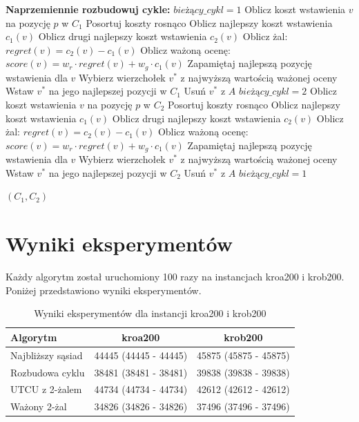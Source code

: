 \documentclass[12pt,a4paper]{article}
\begin{document}
\begin{algorithm}
\begin{algorithmic}[1]
\State \textbf{Naprzemiennie rozbudowuj cykle:}
\State $bieżący\_cykl = 1$ 
                \State Oblicz koszt wstawienia $v$ na pozycję $p$ w $C_1$
            \EndFor
            \State Posortuj koszty rosnąco
            \State Oblicz najlepszy koszt wstawienia $c_1(v)$
            \State Oblicz drugi najlepszy koszt wstawienia $c_2(v)$
            \State Oblicz żal: $regret(v) = c_2(v) - c_1(v)$
            \State Oblicz ważoną ocenę: $score(v) = w_r \cdot regret(v) + w_g \cdot c_1(v)$
            \State Zapamiętaj najlepszą pozycję wstawienia dla $v$
        \EndFor
        \State Wybierz wierzchołek $v^*$ z najwyższą wartością ważonej oceny
        \State Wstaw $v^*$ na jego najlepszej pozycji w $C_1$
        \State Usuń $v^*$ z $A$
        \State $bieżący\_cykl = 2$
    \Else
                \State Oblicz koszt wstawienia $v$ na pozycję $p$ w $C_2$
            \EndFor
            \State Posortuj koszty rosnąco
            \State Oblicz najlepszy koszt wstawienia $c_1(v)$
            \State Oblicz drugi najlepszy koszt wstawienia $c_2(v)$
            \State Oblicz żal: $regret(v) = c_2(v) - c_1(v)$
            \State Oblicz ważoną ocenę: $score(v) = w_r \cdot regret(v) + w_g \cdot c_1(v)$
            \State Zapamiętaj najlepszą pozycję wstawienia dla $v$
        \EndFor
        \State Wybierz wierzchołek $v^*$ z najwyższą wartością ważonej oceny
        \State Wstaw $v^*$ na jego najlepszej pozycji w $C_2$
        \State Usuń $v^*$ z $A$
        \State $bieżący\_cykl = 1$
    \EndIf
\EndWhile

\State \Return $(C_1, C_2)$
\end{algorithmic}
\end{algorithm}

\section{Wyniki eksperymentów}
Każdy algorytm został uruchomiony 100 razy na instancjach kroa200 i krob200. Poniżej przedstawiono wyniki eksperymentów.

\begin{table}[H]
\centering
\caption{Wyniki eksperymentów dla instancji kroa200 i krob200}
\begin{tabular}{lcc}
\toprule
\textbf{Algorytm} & \textbf{kroa200} & \textbf{krob200} \\
\midrule
Najbliższy sąsiad & 44445 (44445 - 44445) & 45875 (45875 - 45875) \\
Rozbudowa cyklu & 38481 (38481 - 38481) & 39838 (39838 - 39838) \\
UTCU z 2-żalem & 44734 (44734 - 44734) & 42612 (42612 - 42612) \\
Ważony 2-żal & 34826 (34826 - 34826) & 37496 (37496 - 37496) \\
\bottomrule
\end{tabular}
\end{table}
\end{document}
